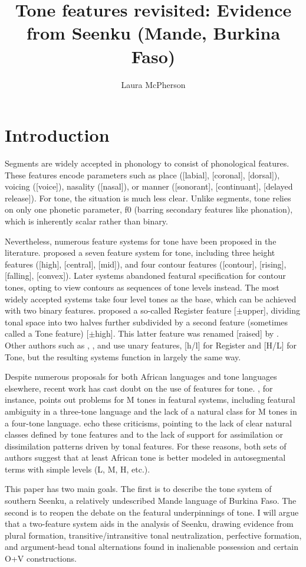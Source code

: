 \documentclass[output=paper]{langsci/langscibook}
\title{Tone features revisited: Evidence from Seenku (Mande, Burkina Faso)}
\author{%
Laura McPherson \affiliation{Dartmouth College} 
}
\begin{document}
 \section{Introduction}
 
 Segments are widely accepted in phonology to consist of phonological features. These features encode parameters such as place ([labial], [coronal], [dorsal]), voicing ([voice]), nasality ([nasal]), or manner ([sonorant], [continuant], [delayed release]). For tone, the situation is much less clear. Unlike segments, tone relies on only one phonetic parameter, f0 (barring secondary features like phonation), which is inherently scalar rather than binary.
 
Nevertheless, numerous feature systems for tone have been proposed in the literature. \citet{Wang67} proposed a seven feature system for tone, including three height features ([high], [central], [mid]), and four contour features ([contour], [rising], [falling], [convex]). Later systems abandoned featural specification for contour tones, opting to view contours as sequences of tone levels instead. The most widely accepted systems take four level tones as the base, which can be achieved with two binary features. \citet{Yip80} proposed a so-called Register feature [$\pm$upper], dividing tonal space into two halves further subdivided by a second feature (sometimes called a Tone feature) [$\pm$high]. This latter feature was renamed [raised] by \citet{Pulleyblank86}. Other authors such as \citet{Clements83}, \citet{Snider90}, and \citet{Hyman93} use unary features, [h/l] for Register and [H/L] for Tone, but the resulting systems function in largely the same way.

Despite numerous proposals for both African languages and tone languages elsewhere, recent work has cast doubt on the use of features for tone. \citet{Hyman10b}, for instance, points out problems for M tones in featural systems, including featural ambiguity in a three-tone language and the lack of a natural class for M tones in a four-tone language. \citet{Clementsetal10} echo these criticisms, pointing to the lack of clear natural classes defined by tone features and to the lack of support for assimilation or dissimilation patterns driven by tonal features. For these reasons, both sets of authors suggest that at least African tone is better modeled in autosegmental terms with simple levels (L, M, H, etc.).

This paper has two main goals. The first is to describe the tone system of southern Seenku, a relatively undescribed Mande language of Burkina Faso. The second is to reopen the debate on the featural underpinnings of tone. I will argue that a two-feature system aids in the analysis of Seenku, drawing evidence from plural formation, transitive/intransitive tonal neutralization, perfective formation, and argument-head tonal alternations found in inalienable possession and certain O+V constructions.
\end{document}
